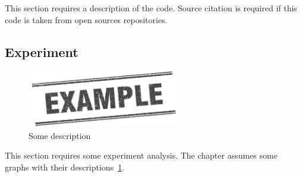 \documentclass[../../main.tex]{subfiles}
\begin{document}
This section requires a description of the code. Source citation is required if this code is taken from open sources repositories.

\subsection{Experiment}

\begin{figure}[h!]
\centering
\includegraphics[width=0.6\textwidth]{figures/fig1}
\caption{Some description}
\label{fig:example:1}
\end{figure}

This section requires some experiment analysis. The chapter assumes some graphs with their descriptions~\ref{fig:example:1}.
\end{document}
